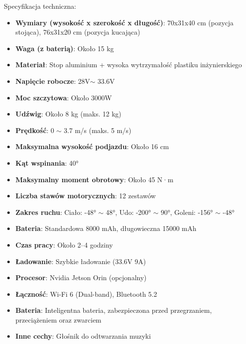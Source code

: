 \documentclass[12pt]{article}
\begin{document}
Specyfikacja techniczna:
\begin{itemize}
    \item \textbf{Wymiary (wysokość x szerokość x długość)}: 70x31x40 cm (pozycja stojąca), 76x31x20 cm (pozycja kucająca)
    \item \textbf{Waga (z baterią)}: Około 15 kg
    \item \textbf{Materiał}: Stop aluminium + wysoka wytrzymałość plastiku inżynierskiego
    \item \textbf{Napięcie robocze}: 28V$ \sim$ 33.6V
    \item \textbf{Moc szczytowa}: Około 3000W
    \item \textbf{Udźwig}: Około 8 kg (maks. 12 kg)
    \item \textbf{Prędkość}: 0 $\sim$ 3.7 m/s (maks. 5 m/s)
    \item \textbf{Maksymalna wysokość podjazdu}: Około 16 cm
    \item \textbf{Kąt wspinania}: 40°
    \item \textbf{Maksymalny moment obrotowy}: Około 45 N·m
    \item \textbf{Liczba stawów motorycznych}: 12 zestawów
    \item \textbf{Zakres ruchu}: Ciało: -48° $\sim$ 48°, Udo: -200° $\sim$ 90°, Goleni: -156° $\sim$ -48°
    \item \textbf{Bateria}: Standardowa 8000 mAh, długowieczna 15000 mAh
    \item \textbf{Czas pracy}: Około 2–4 godziny
    \item \textbf{Ładowanie}: Szybkie ładowanie (33.6V 9A)
    \item \textbf{Procesor}: Nvidia Jetson Orin (opcjonalny)
    \item \textbf{Łączność}: Wi-Fi 6 (Dual-band), Bluetooth 5.2
    \item \textbf{Bateria}: Inteligentna bateria, zabezpieczona przed przegrzaniem, przeciążeniem oraz zwarciem
    \item \textbf{Inne cechy}: Głośnik do odtwarzania muzyki
\end{itemize}
\end{document}
